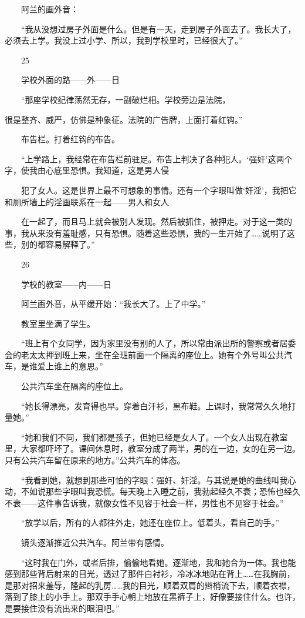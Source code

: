 　　阿兰的画外音： 

　　“我从没想过房子外面是什么。但是有一天，走到房子外面去了。我长大了，必须去上学。我没上过小学、所以，我到学校里时，已经很大了。” 

　　25 

　　学校外面的路——外——日 

　　“那座学校纪律荡然无存，一副破烂相。学校旁边是法院， 

很是整齐、威严，仿佛是种象征。法院的广告牌，上面打着红钩。” 

　　布告栏。打着红钩的布告。 

　　“上学路上，我经常在布告栏前驻足。布告上判决了各种犯人。‘强奸’这两个字，使我由心底里恐惧。我知道，这是男人侵 

　　犯了女人。这是世界上最不可想象的事情。还有一个字眼叫做‘奸淫’，我把它和厕所墙上的淫画联系在一起——男人和女人 

　　在一起了，而且马上就会被别人发现。然后被抓住，被押走。对于这一类的事，我从来没有羞耻感，只有恐惧。随着这些恐惧，我的一生开始了……说明了这些，别的都容易解释了。” 

　　26 

　　学校的教室——内——日 

　　阿兰画外音，从平缓开始：“我长大了。上了中学。” 

　　教室里坐满了学生。 

　　“班上有个女同学，因为家里没有别的人了，所以常由派出所的警察或者居委会的老太太押到班上来，坐在全班前面一个隔离的座位上。她有个外号叫公共汽车，是谁爱上谁上的意思。” 

　　公共汽车坐在隔离的座位上。 

　　“她长得漂亮，发育得也早。穿着白汗衫，黑布鞋。上课时，我常常久久地打量她。” 

　　“她和我们不同，我们都是孩子，但她已经是女人了。一个女人出现在教室里，大家都吓坏了。课间休息时，教室分成了两半，男的在一边，女的在另一边。只有公共汽车留在原来的地方。”公共汽车的体态。 

　　“我看到她，就想到那些可怕的字眼：强奸、奸淫。与其说是她的曲线叫我心动，不如说那些字眼叫我恐慌。每天晚上入睡之前，我勃起经久不衰；恐怖也经久不衰——这件事告诉我，就像女性不见容于社会一样，男性也不见容于社会。” 

　　“放学以后，所有的人都往外走，她还在座位上。低着头，看自己的手。” 

　　镜头逐渐推近公共汽车。阿兰带有感情。 

　　“这时我在门外，或者后排，偷偷地看她。逐渐地，我和她合为一体。我也能感到那些背后射来的目光，透过了那件白衬衫，冷冰冰地贴在背上……在我胸前，是那对招来羞辱，隆起的乳房……我的目光，顺着双肩的辫梢流下去，顺着衣襟，落到了膝上的小手上。那双手手心朝上地放在黑裤子上，好像要接住什么。也许，是要接住没有流出来的眼泪吧。” 

